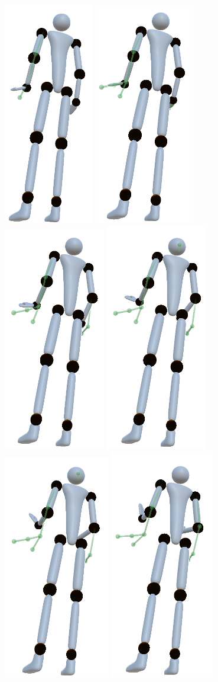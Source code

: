 \begin{figure}[h!]
	\centering
	\includegraphics[width=0.11\linewidth]{pictures/kwonSequence1.png}\hfill
	\includegraphics[width=0.12\linewidth]{pictures/kwonSequence2.png}\hfill
	\includegraphics[width=0.12\linewidth]{pictures/kwonSequence3.png}\hfill
	\includegraphics[width=0.12\linewidth]{pictures/kwonSequence4.png}\hfill
	\includegraphics[width=0.12\linewidth]{pictures/kwonSequence5.png}\hfill
	\includegraphics[width=0.12\linewidth]{pictures/kwonSequence6.png}\hfill

\end{figure}
